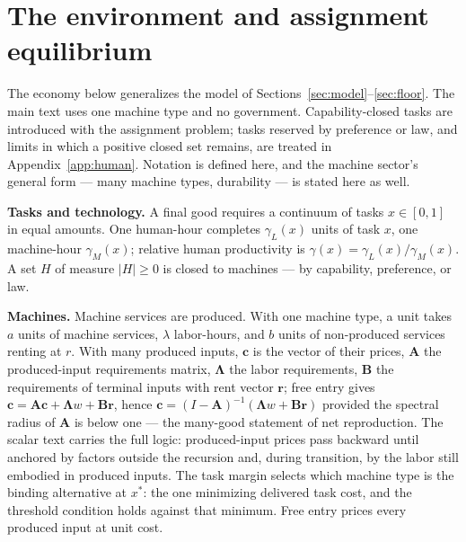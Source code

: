 \documentclass[12pt]{article}
\theoremstyle{plain}
\begin{document}
\section{The environment and assignment equilibrium}\label{app:environment}

The economy below generalizes the model of
Sections~\ref{sec:model}--\ref{sec:floor}. The main text uses one machine
type and no government. Capability-closed tasks are introduced with the
assignment problem; tasks reserved by preference or law, and limits in which
a positive closed set remains, are treated in Appendix~\ref{app:human}. Notation is defined here, and the machine sector's general form --- many machine types, durability --- is stated here as well.

\textbf{Tasks and technology.} A final good requires a continuum of tasks $x\in[0,1]$ in equal amounts. One human-hour completes $\gamma _L(x)$ units of task $x$, one machine-hour $\gamma _M(x)$; relative human productivity is $\gamma (x) = \gamma _L(x)/\gamma _M(x)$. A set $H$ of measure $|H| \ge 0$ is closed to machines --- by capability, preference, or law.

\textbf{Machines.} Machine services are produced. With one machine type, a unit takes $a$ units of machine services, $\lambda$ labor-hours, and $b$ units of non-produced services renting at $r$. With many produced inputs, $\mathbf{c}$ is the vector of their prices, $\mathbf{A}$ the produced-input requirements matrix, $\boldsymbol{\Lambda}$ the labor requirements, $\mathbf{B}$ the requirements of terminal inputs with rent vector $\mathbf{r}$; free entry gives $\mathbf{c} = \mathbf{A}\mathbf{c} + \boldsymbol{\Lambda}w + \mathbf{B}\mathbf{r}$, hence $\mathbf{c} = (I-\mathbf{A})^{-1}(\boldsymbol{\Lambda}w + \mathbf{B}\mathbf{r})$ provided the spectral radius of $\mathbf{A}$ is below one --- the many-good statement of net reproduction. The scalar text carries the full logic: produced-input prices pass backward until anchored by factors outside the recursion and, during transition, by the labor still embodied in produced inputs. The task margin selects which machine type is the binding alternative at $x^*$: the one minimizing delivered task cost, and the threshold condition holds against that minimum. Free entry prices every produced input at unit cost.
\end{document}
